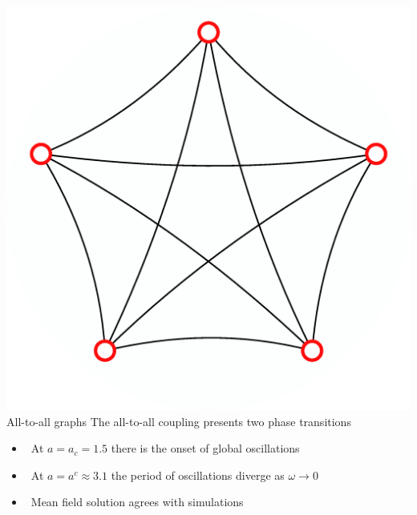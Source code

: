 \documentclass[serif,mathserif]{beamer}
\begin{document}
\begin{frame}{\includegraphics[height=0.06\textheight]{ring-complete-thumb.eps}\hspace{0.25cm} All-to-all graphs}
    The all-to-all coupling presents two phase transitions
    \begin{itemize}
        \vspace{0.3cm}
        \item \ \pause At $a=a_c=1.5$ there is the onset of global oscillations
        \vspace{0.3cm}
        \item \ \pause At $a=a^c\approx 3.1$ the period of oscillations diverge as $\omega \rightarrow 0$
        \vspace{0.3cm}
        \item \ \pause Mean field solution agrees with simulations
    \end{itemize}
\end{frame}
\end{document}
